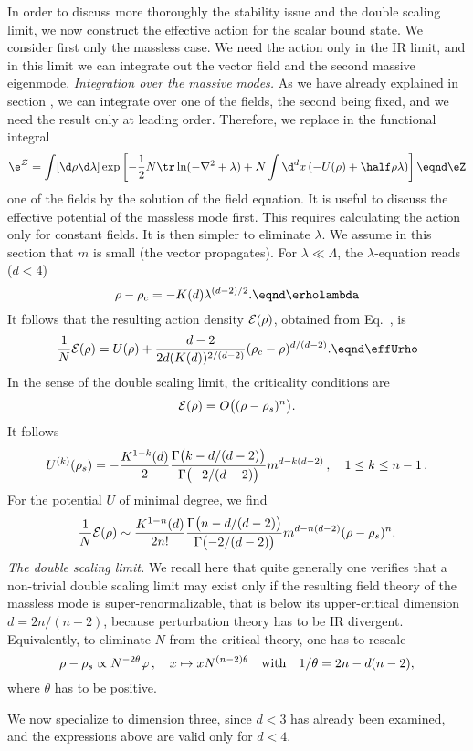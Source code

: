 In order to discuss more thoroughly the stability issue and the double scaling
limit, we
now construct the effective action for the scalar bound state. We consider
first only the massless case. We  need the action only in the IR limit, and in
this limit we can integrate out the vector field and the second massive eigenmode.\sslbl\sdouble
\medskip
{\it Integration over the massive modes.}
As we have already explained in section \stwodim, we can integrate over one of
the fields, the second being fixed, and we need  the result only at leading
order. Therefore, we replace in the functional integral
$$\e^{\cal Z}=\int [\d\rho\d\lambda]\exp\left[-\frac{1}{2}N\tr \ln(-\nabla ^2 + \lambda)
+N\int \d^dx\left(- U(\rho) +\half \rho \lambda\right)\right] \eqnd\eZ$$
one of the fields by the solution of the field equation. It is useful to discuss the effective potential of the
massless mode first. This requires calculating the action only for constant fields.
It is then simpler to eliminate $\lambda$. We
assume in this section that $m$ is small (the vector propagates).
For $\lambda\ll\Lambda$, the $\lambda$-equation reads ($d<4$)
$$\rho-\rho_c=-K(d)\lambda^{(d-2)/2}.  \eqnd\erholambda $$
It follows that the resulting action density $ {\cal E}(\rho)$, obtained from
Eq.~\eWeffrho, is
$${1\over N}{\cal E}(\rho)=U(\rho)+{d-2\over 2d (K(d))^{2/(d-2)}}(\rho_c-\rho)^{d/(d-2)}.
\eqnd\effUrho$$
In the sense of the double scaling limit, the criticality conditions are
$$ {\cal E}(\rho)=O\bigl((\rho-\rho_s)^n\bigr).$$
It follows
$$U^{(k)}(\rho_s)=- { K^{1-k}(d)\over2}{\Gamma\bigl(k-d/(d-2)\bigr)\over
\Gamma\bigl(-2/(d-2)\bigr)}m^{d-k(d-2)}\,,\quad 1\le k\le n-1\, .$$
For the potential $U$ of minimal degree, we find
$${1\over N}{\cal E}(\rho)\sim { K^{1-n}(d)\over 2 n!}
{\Gamma\bigl(n-d/(d-2)\bigr)\over
\Gamma\bigl(-2/(d-2)\bigr)}m^{d-n(d-2)}(\rho-\rho_s)^n .$$
\medskip
{\it The double scaling limit.}
We recall here that quite generally one verifies that a non-trivial double
scaling limit may exist only if the resulting field theory of the massless
mode is
super-renormalizable, that is below its upper-critical dimension $d=2n/(n-2)$,
because perturbation theory has to be IR divergent. Equivalently, to
eliminate $N$ from the critical theory, one has to rescale
$$\rho-\rho_s\propto N^{-2\theta}\varphi\,,\quad x\mapsto x N^{(n-2)\theta}
\quad {\rm with}\quad 1/\theta=2n-d(n-2),$$
where $\theta$ has to be positive.
\par
We now specialize to dimension three, since $d<3$ has already been
examined, and the expressions above are valid only for $d<4$.
